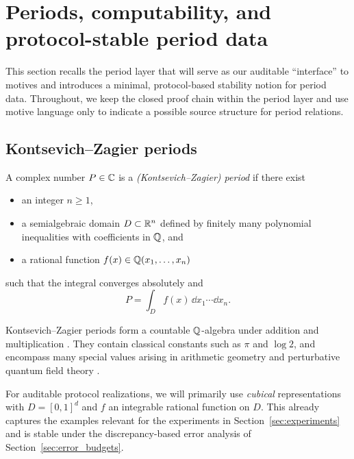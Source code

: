 
\section{Periods, computability, and protocol-stable period data}
\label{sec:periods_motives_wishes}

This section recalls the period layer that will serve as our auditable ``interface'' to motives and introduces a minimal, protocol-based stability notion for period data. Throughout, we keep the closed proof chain within the period layer and use motive language only to indicate a possible source structure for period relations.

\subsection{Kontsevich--Zagier periods}
\label{sec:kz_periods}

\begin{definition}
\label{def:kz_period}
A complex number $P\in\mathbb{C}$ is a \emph{(Kontsevich--Zagier) period} if there exist
\begin{itemize}
\item an integer $n\ge 1$,
\item a semialgebraic domain $D\subset\mathbb{R}^n$ defined by finitely many polynomial inequalities with coefficients in $\mathbb{Q}$, and
\item a rational function $f(x)\in\mathbb{Q}(x_1,\dots,x_n)$
\end{itemize}
such that the integral converges absolutely and
\begin{equation}
\label{eq:kz_def}
P = \int_D f(x)\,\dd x_1\cdots \dd x_n.
\end{equation}
\end{definition}

Kontsevich--Zagier periods form a countable $\mathbb{Q}$-algebra under addition and multiplication \cite{KontsevichZagier2001}. They contain classical constants such as $\pi$ and $\log 2$, and encompass many special values arising in arithmetic geometry and perturbative quantum field theory \cite{KontsevichZagier2001,Brown2012}.

\begin{remark}
\label{rem:controlled_scope}
For auditable protocol realizations, we will primarily use \emph{cubical} representations with $D=[0,1]^d$ and $f$ an integrable rational function on $D$. This already captures the examples relevant for the experiments in Section~\ref{sec:experiments} and is stable under the discrepancy-based error analysis of Section~\ref{sec:error_budgets}.
\end{remark}

